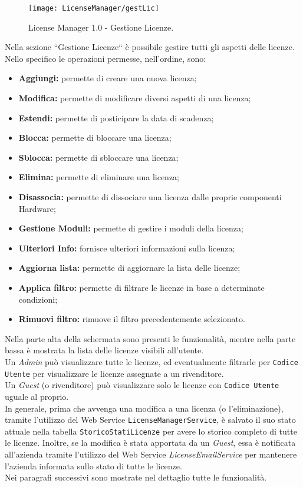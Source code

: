 \begin{figure}[!h] 
    \centering 
    \texttt{[image: LicenseManager/gestLic]} 
    \caption{License Manager 1.0 - Gestione Licenze.}
\label{gestLic}
\end{figure}

Nella sezione “Gestione Licenze“ è possibile gestire tutti gli aspetti delle licenze.
Nello specifico le operazioni permesse, nell'ordine, sono:
\begin{itemize}
\item \textbf{Aggiungi:} permette di creare una nuova licenza;
\item \textbf{Modifica:} permette di modificare diversi aspetti di una licenza;
\item \textbf{Estendi:} permette di posticipare la data di scadenza;
\item \textbf{Blocca:} permette di bloccare una licenza;
\item \textbf{Sblocca:} permette di sbloccare una licenza;
\item \textbf{Elimina:} permette di eliminare una licenza;
\item \textbf{Disassocia:} permette di dissociare una licenza dalle proprie componenti Hardware;
\item \textbf{Gestione Moduli:} permette di gestire i moduli della licenza;
\item \textbf{Ulteriori Info:} fornisce ulteriori informazioni sulla licenza;
\item \textbf{Aggiorna lista:} permette di aggiornare la lista delle licenze;
\item \textbf{Applica filtro:} permette di filtrare le licenze in base a determinate condizioni;
\item \textbf{Rimuovi filtro:} rimuove il filtro precedentemente selezionato.
\end{itemize} 
Nella parte alta della schermata sono presenti le funzionalità, mentre nella parte bassa è mostrata la lista delle licenze visibili all’utente.
\\
Un \textit{Admin} può visualizzare tutte le licenze, ed eventualmente filtrarle per \texttt{Codice Utente} per visualizzare le licenze assegnate a un rivenditore.
\\
Un \textit{Guest} (o rivenditore) può visualizzare solo le licenze con \texttt{Codice Utente} uguale al proprio.
\\

In generale, prima che avvenga una modifica a una licenza (o l'eliminazione), tramite l'utilizzo del Web Service \texttt{LicenseManagerService}, è salvato il suo stato attuale nella tabella \texttt{StoricoStatiLicenze} per avere lo storico completo di tutte le licenze. Inoltre, se la modifica è stata apportata da un \textit{Guest}, essa è notificata all'azienda tramite l'utilizzo del Web Service \textit{LicenseEmailService} per mantenere l'azienda informata sullo stato di tutte le licenze. 
\\Nei paragrafi successivi sono mostrate nel dettaglio tutte le funzionalità. 

